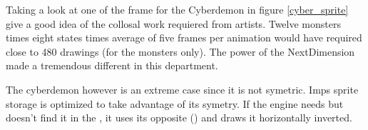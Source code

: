 \par
Taking a look at one of the frame for the Cyberdemon in figure \ref{cyber_sprite} give a good idea of the collosal work requiered from artists. Twelve monsters times eight states times average of five frames per animation would have required close to 480 drawings (for the monsters only). The power of the NextDimension made a tremendous different in this department.\\
\par
The cyberdemon however is an extreme case since it is not symetric. Imps sprite storage is optimized to take advantage of its symetry. If the engine needs  but doesn't find it in the , it uses its opposite () and draws it horizontally inverted.\\ 
\par
{}




\begin{figure}[H] \centering
{}
\end{figure}
\par
{}\\
\par 
{}





